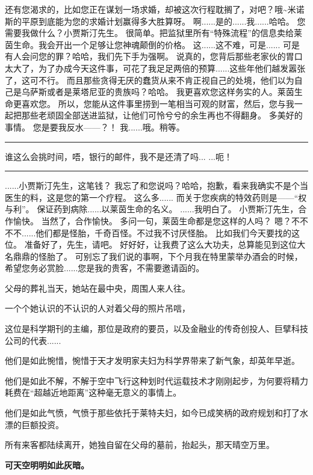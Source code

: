 \documentclass[openany]{book}
\begin{document}
\begin{dialogue}
     还有您渴求的，比如您正在谋划一场求婚，却被这次行程耽搁了，对吧？哦\sim 米诺斯的平原到底能为您的求婚计划赢得多大胜算呀。
     啊......是的......我......哈哈。
     您需要我做什么？小贾斯汀先生。
     很简单。把监狱里所有“特殊流程”的信息卖给莱茵生命。我会开出一个足够让您神魂颠倒的价格。
     这......这不难，可是......
     可是有人会问您的罪？哈哈，我们先下手为强啊。
     说真的，您背后那些老家伙的胃口太大了，为了办成今天这件事，可花了我足足两倍的预算......这些年他们越发嚣张了，这可不行。
     而且那些贪得无厌的蠢货从来不肯正视自己的处境，他们以为自己是乌萨斯或者是莱塔尼亚的贵族吗？哈哈。
     我更喜欢您这样务实的人。莱茵生命更喜欢您。
     所以，您能从这件事里捞到一笔相当可观的财富，然后，您与我一起把那些老顽固全部送进监狱，让他们可怜兮兮的余生再也不得翻身。
     多美好的事情。
     您是要我反水——？！
     我......哦。稍等。
    \par\noindent\rule{\textwidth}{0.4pt}
     谁这么会挑时间，唔，银行的邮件，我不是还清了吗...
     ...呃！
    \par\noindent\rule{\textwidth}{0.4pt}
     ......小贾斯汀先生，这笔钱？
     我忘了和您说吗？哈哈，抱歉，看来我确实不是个当医生的料，这是您的第一个疗程。
     这么多......
     而关于您疾病的特效药则是——“权与利”。
     保证药到病除......以莱茵生命的名义。
     ......我明白了。
     小贾斯汀先生，合作愉快。
     当然了，合作愉快。
     多问一句，莱茵生命都是您这样的人吗？
     嗯？不不不不......他们都是怪胎，千奇百怪。不过我不讨厌怪胎。
     比如我们今天要找的这位。
     准备好了，先生，请吧。
     好好好，让我费了这么大功夫，总算能见到这位大名鼎鼎的怪胎了。
     可别忘了我们说的事啊，下个月我在特里蒙举办酒会的时候，希望您务必赏脸......您是我的贵客，不需要邀请函的。
\end{dialogue}
\par
父母的葬礼当天，她站在最中央，周围人来人往。\par
一个个她认识的不认识的人对着父母的照片吊唁，\par
这位是科学期刊的主编，那位是政府的要员，以及金融业的传奇创投人、巨擘科技公司的代表......\par
他们是如此惋惜，惋惜于天才发明家夫妇为科学界带来了新气象，却英年早逝。\par
他们是如此不解，不解于空中飞行这种划时代运载技术才刚刚起步，为何要将精力耗费在“超越近地距离”这种毫无意义的事情上。\par
他们是如此气愤，气愤于那些依托于莱特夫妇，如今已成笑柄的政府规划和打了水漂的巨额投资。\par
所有来客都陆续离开，她独自留在父母的墓前，抬起头，那天晴空万里。\par
\begin{center} \textbf{可天空明明如此灰暗。}\end{center}
\end{document}
